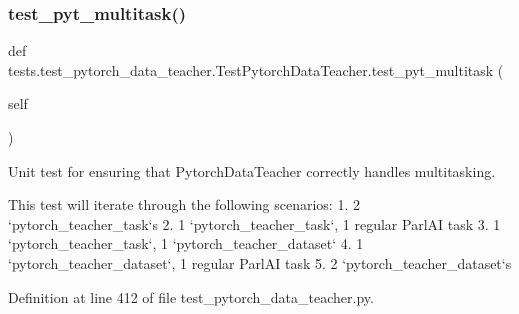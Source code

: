 \subsubsection{\texorpdfstring{test\+\_\+pyt\+\_\+multitask()}{test\_pyt\_multitask()}}
{\footnotesize\ttfamily def tests.\+test\+\_\+pytorch\+\_\+data\+\_\+teacher.\+Test\+Pytorch\+Data\+Teacher.\+test\+\_\+pyt\+\_\+multitask (\begin{DoxyParamCaption}\item[{}]{self }\end{DoxyParamCaption})}

\begin{DoxyVerb}Unit test for ensuring that PytorchDataTeacher correctly handles multitasking.

This test will iterate through the following scenarios:
    1. 2 `pytorch_teacher_task`s
    2. 1 `pytorch_teacher_task`, 1 regular ParlAI task
    3. 1 `pytorch_teacher_task`, 1 `pytorch_teacher_dataset`
    4. 1 `pytorch_teacher_dataset`, 1 regular ParlAI task
    5. 2 `pytorch_teacher_dataset`s
\end{DoxyVerb}
 

Definition at line 412 of file test\+\_\+pytorch\+\_\+data\+\_\+teacher.\+py.


